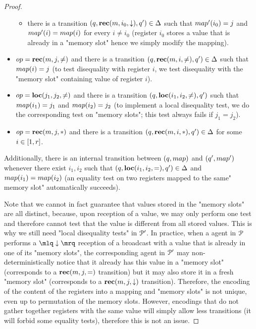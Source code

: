 \begin{proof}
\begin{itemize}
\begin{itemize}
			\item there is a transition $(q, \textbf{rec}(m, i_0, \downarrow), q') \in \Delta$ such that $\map'(i_0)=j$ and $\map'(i) = \map(i)$ for every $i \neq i_0$ (register $i_0$ stores a value that is already in a "memory slot" hence we simply modify the mapping).
		\end{itemize} 
		
		\item $\op = \rec{m}{j}{\diseqtestact}$ and there is a transition $(q, \textbf{rec}(m, i, {\ne}), q') \in \Delta$ such that $\map(i)=j$ (to test disequality with register $i$, we test disequality with the "memory slot" containing value of register $i$).
		

		\item $\op=\loc{j_1}{j_2}{\diseqtestact}$ and there is a transition $(q, \textbf{loc}(i_1,i_2,{\ne}), q')$ such that $\map(i_1)=j_1$ and $\map(i_2) = j_2$ (to implement a local disequality test, we do the corresponding test on "memory slots"; this test always fails if $j_1 = j_2$).
		
		
		\item $\op = \rec{m}{j}{\dummyact}$ and there is a transition $(q, \textbf{rec}(m, i, {*}), q') \in \Delta$ for some $i \in [1,r]$.
	\end{itemize}
	
	Additionally, there is an internal transition between $(q,\map)$ and $(q',\map')$ whenever there exist $i_1, i_2$ such that $(q, \textbf{loc}(i_1,i_2,{=}), q') \in \Delta$ and $\map(i_1) = \map(i_2)$ (an equality test on two registers mapped to the same" memory slot" automatically succeeds).

	Note that we cannot in fact guarantee that values stored in the "memory slots" are all distinct, because, upon reception of a value, we may only perform one test and therefore cannot test that the value is different from all stored values. This is why we still need "local disequality tests" in $\mathcal{P}'$. In practice, when a agent in $\mathcal{P}$ performs a $\quotemarks{\enregact}$ reception of a broadcast with a value that is already in one of its "memory slots", the corresponding agent in $\mathcal{P}'$ may non-deterministically notice that it already has this value in a "memory slot" (corresponds to a $\textbf{rec}(m, j, {=})$ transition) but it may also store it in a fresh "memory slot" (corresponds to a $\textbf{rec}(m, j, \downarrow)$ transition). Therefore, the encoding of the content of the registers into a mapping and "memory slots" is not unique, even up to permutation of the memory slots. However, encodings that do not gather together registers with the same value will simply allow less transitions (it will forbid some equality tests), therefore this is not an issue. 


\end{proof}
